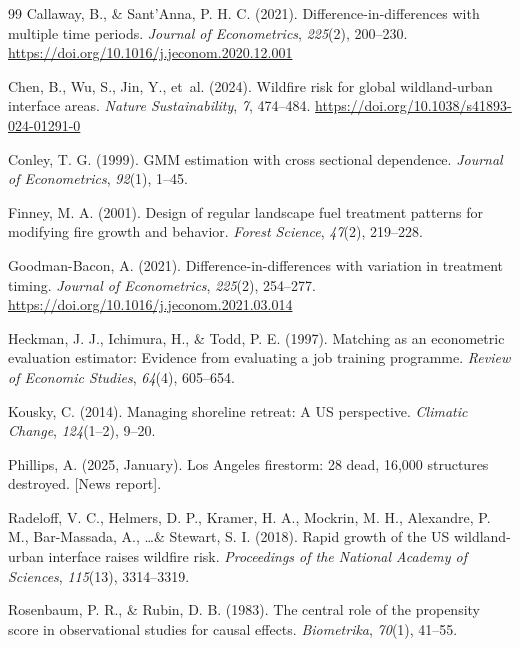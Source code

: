 \documentclass[12pt, letterpaper]{article}
\begin{document}
\begin{thebibliography}{99}
Callaway, B., \& Sant'Anna, P. H. C. (2021). Difference-in-differences with multiple time periods. \textit{Journal of Econometrics}, \textit{225}(2), 200--230. \url{https://doi.org/10.1016/j.jeconom.2020.12.001}

Chen, B., Wu, S., Jin, Y., et~al. (2024). Wildfire risk for global wildland-urban interface areas. \textit{Nature Sustainability}, \textit{7}, 474--484. \url{https://doi.org/10.1038/s41893-024-01291-0}

Conley, T. G. (1999). GMM estimation with cross sectional dependence. \textit{Journal of Econometrics}, \textit{92}(1), 1--45.

Finney, M. A. (2001). Design of regular landscape fuel treatment patterns for modifying fire growth and behavior. \textit{Forest Science}, \textit{47}(2), 219--228.

Goodman-Bacon, A. (2021). Difference-in-differences with variation in treatment timing. \textit{Journal of Econometrics}, \textit{225}(2), 254--277. \url{https://doi.org/10.1016/j.jeconom.2021.03.014}

Heckman, J. J., Ichimura, H., \& Todd, P. E. (1997). Matching as an econometric evaluation estimator: Evidence from evaluating a job training programme. \textit{Review of Economic Studies}, \textit{64}(4), 605--654.

Kousky, C. (2014). Managing shoreline retreat: A US perspective. \textit{Climatic Change}, \textit{124}(1--2), 9--20.

Phillips, A. (2025, January). Los Angeles firestorm: 28 dead, 16,000 structures destroyed. [News report].

Radeloff, V. C., Helmers, D. P., Kramer, H. A., Mockrin, M. H., Alexandre, P. M., Bar-Massada, A., \ldots \& Stewart, S. I. (2018). Rapid growth of the US wildland-urban interface raises wildfire risk. \textit{Proceedings of the National Academy of Sciences}, \textit{115}(13), 3314--3319.

Rosenbaum, P. R., \& Rubin, D. B. (1983). The central role of the propensity score in observational studies for causal effects. \textit{Biometrika}, \textit{70}(1), 41--55.


\end{thebibliography}
\end{document}
